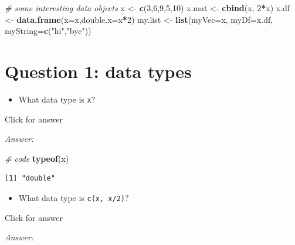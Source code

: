 \documentclass[
]{book}
\newenvironment{Shaded}{\begin{snugshade}}{\end{snugshade}}
\newcommand{\AttributeTok}[1]{\textcolor[rgb]{0.13,0.29,0.53}{#1}}
\newcommand{\CommentTok}[1]{\textcolor[rgb]{0.56,0.35,0.01}{\textit{#1}}}
\newcommand{\DecValTok}[1]{\textcolor[rgb]{0.00,0.00,0.81}{#1}}
\newcommand{\FunctionTok}[1]{\textcolor[rgb]{0.13,0.29,0.53}{\textbf{#1}}}
\newcommand{\NormalTok}[1]{#1}
\newcommand{\OtherTok}[1]{\textcolor[rgb]{0.56,0.35,0.01}{#1}}
\newcommand{\SpecialCharTok}[1]{\textcolor[rgb]{0.81,0.36,0.00}{\textbf{#1}}}
\newcommand{\StringTok}[1]{\textcolor[rgb]{0.31,0.60,0.02}{#1}}
\providecommand{\tightlist}{%
  \setlength{\itemsep}{0pt}\setlength{\parskip}{0pt}}
\begin{document}
\begin{Shaded}
\begin{Highlighting}[]
\CommentTok{\# some interesting data objects}
\NormalTok{x }\OtherTok{\textless{}{-}} \FunctionTok{c}\NormalTok{(}\DecValTok{3}\NormalTok{,}\DecValTok{6}\NormalTok{,}\DecValTok{9}\NormalTok{,}\DecValTok{5}\NormalTok{,}\DecValTok{10}\NormalTok{)}
\NormalTok{x.mat }\OtherTok{\textless{}{-}} \FunctionTok{cbind}\NormalTok{(x, }\DecValTok{2}\SpecialCharTok{*}\NormalTok{x)}
\NormalTok{x.df }\OtherTok{\textless{}{-}} \FunctionTok{data.frame}\NormalTok{(}\AttributeTok{x=}\NormalTok{x,}\AttributeTok{double.x=}\NormalTok{x}\SpecialCharTok{*}\DecValTok{2}\NormalTok{)}
\NormalTok{my.list }\OtherTok{\textless{}{-}} \FunctionTok{list}\NormalTok{(}\AttributeTok{myVec=}\NormalTok{x, }\AttributeTok{myDf=}\NormalTok{x.df, }\AttributeTok{myString=}\FunctionTok{c}\NormalTok{(}\StringTok{"hi"}\NormalTok{,}\StringTok{"bye"}\NormalTok{))}
\end{Highlighting}
\end{Shaded}

\hypertarget{question-1-data-types}{%
\section{Question 1: data types}\label{question-1-data-types}}

\begin{itemize}
\tightlist
\item
  What data type is \texttt{x}?
\end{itemize}

Click for answer

\emph{Answer:}

\begin{Shaded}
\begin{Highlighting}[]
\CommentTok{\# code}
\FunctionTok{typeof}\NormalTok{(x)}
\end{Highlighting}
\end{Shaded}

\begin{verbatim}
[1] "double"
\end{verbatim}

\begin{itemize}
\tightlist
\item
  What data type is \texttt{c(x,\ x/2)}?
\end{itemize}

Click for answer

\emph{Answer:}
\end{document}
